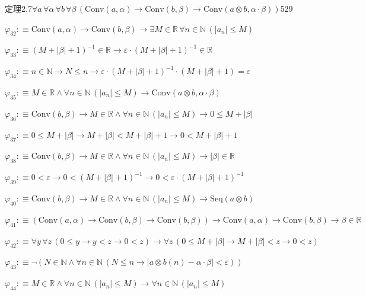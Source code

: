 \begin{fullproof}{定理2.7}{$\forall a\,\forall \alpha\,\forall b\,\forall \beta\,(\mathrm{Conv}(a,\alpha) \to \mathrm{Conv}(b,\beta) \to \mathrm{Conv}(a \otimes b,\alpha \cdot \beta))$}{529}
\begin{abbrevlist}
\item $\varphi_{32} :\equiv \mathrm{Conv}(a,\alpha) \to \mathrm{Conv}(b,\beta) \to \exists M \in \mathbb{R}\,\forall n \in \mathbb{N}\,(\lvert a_{n} \rvert \leq M)$
\item $\varphi_{33} :\equiv (M + \lvert \beta \rvert + 1)^{-1} \in \mathbb{R} \to \varepsilon \cdot (M + \lvert \beta \rvert + 1)^{-1} \in \mathbb{R}$
\item $\varphi_{34} :\equiv n \in \mathbb{N} \to N \leq n \to \varepsilon \cdot (M + \lvert \beta \rvert + 1)^{-1} \cdot (M + \lvert \beta \rvert + 1) = \varepsilon$
\item $\varphi_{35} :\equiv M \in \mathbb{R} \land \forall n \in \mathbb{N}\,(\lvert a_{n} \rvert \leq M) \to \mathrm{Conv}(a \otimes b,\alpha \cdot \beta)$
\item $\varphi_{36} :\equiv \mathrm{Conv}(b,\beta) \to M \in \mathbb{R} \land \forall n \in \mathbb{N}\,(\lvert a_{n} \rvert \leq M) \to 0 \leq M + \lvert \beta \rvert$
\item $\varphi_{37} :\equiv 0 \leq M + \lvert \beta \rvert \to M + \lvert \beta \rvert < M + \lvert \beta \rvert + 1 \to 0 < M + \lvert \beta \rvert + 1$
\item $\varphi_{38} :\equiv \mathrm{Conv}(b,\beta) \to M \in \mathbb{R} \land \forall n \in \mathbb{N}\,(\lvert a_{n} \rvert \leq M) \to \lvert \beta \rvert \in \mathbb{R}$
\item $\varphi_{39} :\equiv 0 < \varepsilon \to 0 < (M + \lvert \beta \rvert + 1)^{-1} \to 0 < \varepsilon \cdot (M + \lvert \beta \rvert + 1)^{-1}$
\item $\varphi_{40} :\equiv \mathrm{Conv}(b,\beta) \to M \in \mathbb{R} \land \forall n \in \mathbb{N}\,(\lvert a_{n} \rvert \leq M) \to \mathrm{Seq}(a \otimes b)$
\item $\varphi_{41} :\equiv (\mathrm{Conv}(a,\alpha) \to \mathrm{Conv}(b,\beta) \to \mathrm{Conv}(b,\beta)) \to \mathrm{Conv}(a,\alpha) \to \mathrm{Conv}(b,\beta) \to \beta \in \mathbb{R}$
\item $\varphi_{42} :\equiv \forall y\,\forall z\,(0 \leq y \to y < z \to 0 < z) \to \forall z\,(0 \leq M + \lvert \beta \rvert \to M + \lvert \beta \rvert < z \to 0 < z)$
\item $\varphi_{43} :\equiv \neg (N \in \mathbb{N} \land \forall n \in \mathbb{N}\,(N \leq n \to \lvert a \otimes b(n) - \alpha \cdot \beta \rvert < \varepsilon))$
\item $\varphi_{44} :\equiv M \in \mathbb{R} \land \forall n \in \mathbb{N}\,(\lvert a_{n} \rvert \leq M) \to \forall n \in \mathbb{N}\,(\lvert a_{n} \rvert \leq M)$

\end{abbrevlist}
\end{fullproof}
